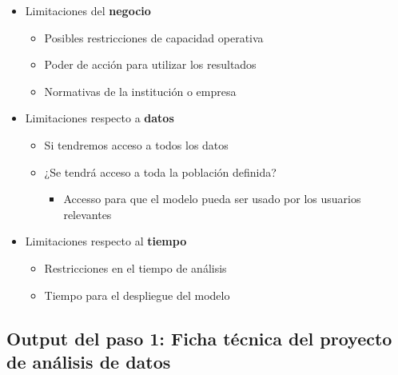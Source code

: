 \documentclass[
]{book}
\providecommand{\tightlist}{%
  \setlength{\itemsep}{0pt}\setlength{\parskip}{0pt}}
\begin{document}
\begin{itemize}
\tightlist
\item
  Limitaciones del \textbf{negocio}

  \begin{itemize}
  \tightlist
  \item
    Posibles restricciones de capacidad operativa
  \item
    Poder de acción para utilizar los resultados
  \item
    Normativas de la institución o empresa
  \end{itemize}
\item
  Limitaciones respecto a \textbf{datos}

  \begin{itemize}
  \tightlist
  \item
    Si tendremos acceso a todos los datos
  \item
    ¿Se tendrá acceso a toda la población definida?

    \begin{itemize}
    \tightlist
    \item
      Accesso para que el modelo pueda ser usado
      por los usuarios relevantes
    \end{itemize}
  \end{itemize}
\item
  Limitaciones respecto al \textbf{tiempo}

  \begin{itemize}
  \tightlist
  \item
    Restricciones en el tiempo de análisis
  \item
    Tiempo para el despliegue del modelo
  \end{itemize}
\end{itemize}

\hypertarget{output-del-paso-1-ficha-tuxe9cnica-del-proyecto-de-anuxe1lisis-de-datos}{%
\subsection{Output del paso 1: Ficha técnica del proyecto de análisis de datos}\label{output-del-paso-1-ficha-tuxe9cnica-del-proyecto-de-anuxe1lisis-de-datos}}
\end{document}
